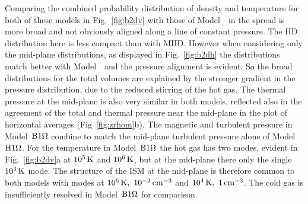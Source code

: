   Comparing the combined probability distribution of density and temperature
  for both of these models in Fig.~\ref{fig:b2dv} with those of Model~\Op\
  in \cite[][Fig. 5.10]{Gent12} the spread is more broad and not obviously 
  aligned along a line of constant pressure.
  The HD distribution here is less compact than with MHD. 
  However when considering only the mid-plane distributions, as displayed in
  Fig.~\ref{fig:b2dh} the distributions match better with Model~\Op\ and the 
  pressure alignment is evident.
  So the broad distributions for the total volumes are explained by the 
  stronger gradient in the pressure distribution, due to the reduced 
  stirring of the hot gas.
  The thermal pressure at the mid-plane is also very similar in both models,
  reflected also in the agreement of the total and thermal pressure near the
  mid-plane in the plot of horizontal averages (Fig~\ref{fig:zrhom}b).
  The magnetic and turbulent pressure in Model~${\mathrm{B}1\rm{\Omega} }$ combine to match the
  mid-plane turbulent pressure alone of Model~${\mathrm{H}1\rm{\Omega}}$.
  For the temperature in Model~${\mathrm{B}1\rm{\Omega} }$ the hot gas has two modes, evident in 
  Fig.~\ref{fig:b2dv}a at $10^5\,{\rm K}$ and $10^6\,{\rm K}$, but at the mid-plane there 
  only the single $10^3\,{\rm K}$ mode. 
  The structure of the ISM at the mid-plane is therefore common to both models
  with modes at $10^6\,{\rm K},~10^{-2}\,{\rm cm^{-3}}$ and $10^4\,{\rm K},~1\,{\rm cm^{-3}}$.
  The cold gas is insufficiently resolved in Model~${\mathrm{B}1\rm{\Omega} }$ for comparison. 
  
